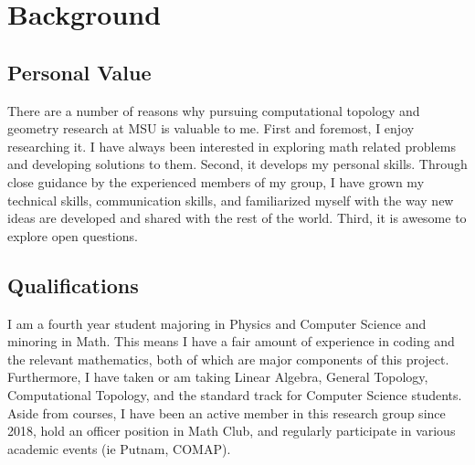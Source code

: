 \documentclass[10.5pt]{article}
\begin{document}



\section{Background}

\subsection{Personal Value}
There are a number of reasons why pursuing computational topology and geometry 
research at MSU is valuable to me. First and foremost, I enjoy researching it. 
I have always been interested in exploring math related problems and developing 
solutions to them. Second, it develops my personal skills. Through close 
guidance by the experienced members of my group, I have grown my technical 
skills, communication skills, and familiarized myself with the way new ideas 
are developed and shared with the rest of the world. Third, it is awesome to 
explore open questions.
\subsection{Qualifications}
I am a fourth year student majoring in Physics and Computer Science and 
minoring in Math. This means I have a fair amount of experience in coding and 
the relevant mathematics, both of which are major components of this project. 
Furthermore, I have taken or am taking Linear Algebra, General Topology, 
Computational Topology, and the standard track for Computer Science students. 
Aside from courses, I have been an active member in this research group since 
2018, hold an officer position in Math Club, and regularly participate in 
various academic events (ie Putnam, COMAP).
\end{document}
